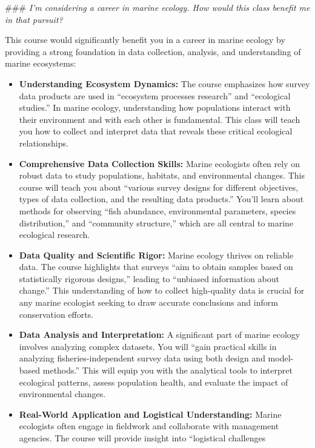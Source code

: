 \documentclass[
  letterpaper,
  oneside,
  open=any]{scrbook}
\providecommand{\tightlist}{%
  \setlength{\itemsep}{0pt}\setlength{\parskip}{0pt}}\usepackage{longtable,booktabs,array}
\begin{document}
\#\#\# \emph{I'm considering a career in marine ecology. How would this
class benefit me in that pursuit?}

This course would significantly benefit you in a career in marine
ecology by providing a strong foundation in data collection, analysis,
and understanding of marine ecosystems:

\begin{itemize}
\tightlist
\item
  \textbf{Understanding Ecosystem Dynamics:} The course emphasizes how
  survey data products are used in ``ecosystem processes research'' and
  ``ecological studies.'' In marine ecology, understanding how
  populations interact with their environment and with each other is
  fundamental. This class will teach you how to collect and interpret
  data that reveals these critical ecological relationships.
\item
  \textbf{Comprehensive Data Collection Skills:} Marine ecologists often
  rely on robust data to study populations, habitats, and environmental
  changes. This course will teach you about ``various survey designs for
  different objectives, types of data collection, and the resulting data
  products.'' You'll learn about methods for observing ``fish abundance,
  environmental parameters, species distribution,'' and ``community
  structure,'' which are all central to marine ecological research.
\item
  \textbf{Data Quality and Scientific Rigor:} Marine ecology thrives on
  reliable data. The course highlights that surveys ``aim to obtain
  samples based on statistically rigorous designs,'' leading to
  ``unbiased information about change.'' This understanding of how to
  collect high-quality data is crucial for any marine ecologist seeking
  to draw accurate conclusions and inform conservation efforts.
\item
  \textbf{Data Analysis and Interpretation:} A significant part of
  marine ecology involves analyzing complex datasets. You will ``gain
  practical skills in analyzing fisheries-independent survey data using
  both design and model-based methods.'' This will equip you with the
  analytical tools to interpret ecological patterns, assess population
  health, and evaluate the impact of environmental changes.
\item
  \textbf{Real-World Application and Logistical Understanding:} Marine
  ecologists often engage in fieldwork and collaborate with management
  agencies. The course will provide insight into ``logistical challenges

\end{itemize}
\end{document}

